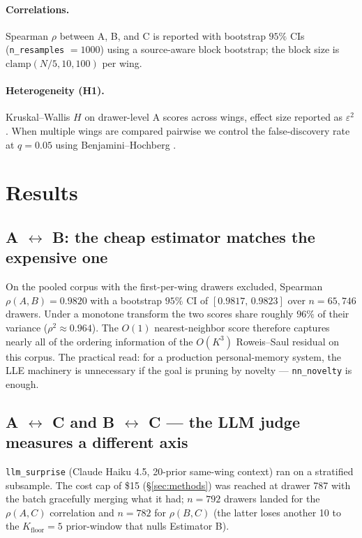 \documentclass[11pt]{article}
\begin{document}
\paragraph{Correlations.}
Spearman $\rho$ between A, B, and C is reported with bootstrap
$95\%$ CIs (\texttt{n\_resamples} $= 1000$) using a source-aware block
bootstrap; the block size is $\mathrm{clamp}(N/5, 10, 100)$ per wing.

\paragraph{Heterogeneity (H1).}
Kruskal--Wallis $H$ \citep{kruskal1952} on drawer-level A scores across
wings, effect size reported as $\varepsilon^2$
\citep{tomczak2014epsilon}. When multiple wings are compared pairwise
we control the false-discovery rate at $q = 0.05$ using
Benjamini--Hochberg \citep{bh1995}.

\section{Results}
\label{sec:results}

\subsection{A $\leftrightarrow$ B: the cheap estimator matches the expensive one}
On the pooled corpus with the first-per-wing drawers excluded, Spearman
$\rho(A, B) = 0.9820$ with a bootstrap $95\%$ CI of
$[0.9817,\, 0.9823]$ over $n = 65{,}746$ drawers. Under a monotone
transform the two scores share roughly $96\%$ of their variance
($\rho^2 \approx 0.964$). The $O(1)$ nearest-neighbor score therefore
captures nearly all of the ordering information of the $O(K^3)$
Roweis--Saul residual on this corpus. The practical read: for a
production personal-memory system, the LLE machinery is unnecessary if
the goal is pruning by novelty --- \texttt{nn\_novelty} is enough.

\subsection{A $\leftrightarrow$ C and B $\leftrightarrow$ C ---
  the LLM judge measures a different axis}

\texttt{llm\_surprise} (Claude Haiku 4.5, 20-prior same-wing context)
ran on a stratified subsample. The cost cap of \$15 (\S\ref{sec:methods})
was reached at drawer 787 with the batch gracefully merging what it
had; $n = 792$ drawers landed for the $\rho(A,C)$ correlation and $n
= 782$ for $\rho(B,C)$ (the latter loses another 10 to the
$K_{\mathrm{floor}} = 5$ prior-window that nulls Estimator B).
\end{document}
